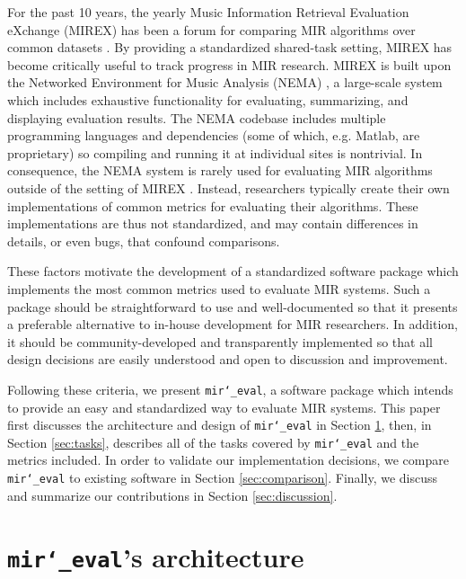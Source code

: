 \documentclass{article}
\def\mireval{\texttt{mir\char`_eval}}
\begin{document}
For the past 10 years, the yearly Music Information Retrieval Evaluation eXchange (MIREX) has been a forum for comparing MIR algorithms over common datasets \cite{downie2008music}.
By providing a standardized shared-task setting, MIREX has become critically useful to track progress in MIR research.
MIREX is built upon the Networked Environment for Music Analysis (NEMA) \cite{west2010networked}, a large-scale system which includes exhaustive functionality for evaluating, summarizing, and displaying evaluation results.
The NEMA codebase includes multiple programming languages and dependencies (some of which, e.g. Matlab, are proprietary) so compiling and running it at individual sites is nontrivial. 
%
In consequence, the NEMA system is rarely used for evaluating MIR algorithms outside of the setting of MIREX \cite{downie2008music}.
Instead, researchers typically create their own implementations of common metrics for evaluating their algorithms.
These implementations are thus not standardized, and may contain differences in details, or even bugs, that confound comparisons.

These factors motivate the development of a standardized software package which implements the most common metrics used to evaluate MIR systems.
Such a package should be straightforward to use and well-documented so that it 
presents a preferable alternative to in-house development for MIR researchers.
In addition, it should be community-developed and transparently implemented so that all design decisions are easily understood and open to discussion and improvement.

Following these criteria, we present \mireval{}, a software package which intends to provide an easy and standardized way to evaluate MIR systems.
This paper first discusses the architecture and design of \mireval{} in Section \ref{sec:architecture}, then, in Section \ref{sec:tasks}, describes all of the tasks covered by \mireval{} and the metrics included.
In order to validate our implementation decisions, we compare \mireval{} to existing software in Section \ref{sec:comparison}.
Finally, we discuss and summarize our contributions in Section \ref{sec:discussion}.

\section{\mireval{}'s architecture}
\label{sec:architecture}
\end{document}
